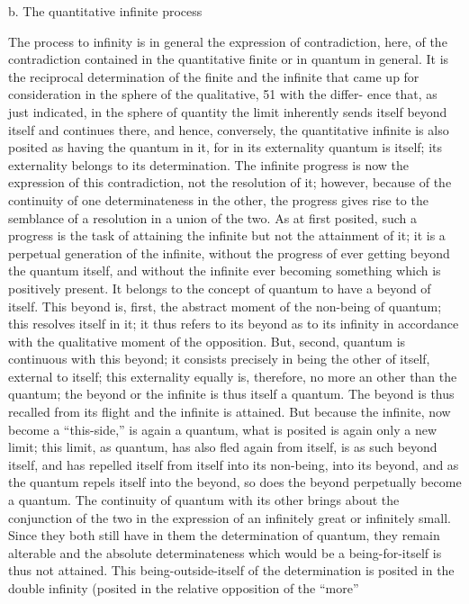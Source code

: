 b. The quantitative infinite process

The process to infinity is in general the expression of contradiction, here,
of the contradiction contained in the quantitative finite or in quantum in
general. It is the reciprocal determination of the finite and the infinite that
came up for consideration in the sphere of the qualitative, 51 with the differ-
ence that, as just indicated, in the sphere of quantity the limit inherently
sends itself beyond itself and continues there, and hence, conversely, the
quantitative infinite is also posited as having the quantum in it, for in its
externality quantum is itself; its externality belongs to its determination.
The infinite progress is now the expression of this contradiction, not the
resolution of it; however, because of the continuity of one determinateness
in the other, the progress gives rise to the semblance of a resolution in a
union of the two. As at first posited, such a progress is the task of attaining
the infinite but not the attainment of it; it is a perpetual generation of the
infinite, without the progress of ever getting beyond the quantum itself, and
without the infinite ever becoming something which is positively present.
It belongs to the concept of quantum to have a beyond of itself. This
beyond is, first, the abstract moment of the non-being of quantum; this
resolves itself in it; it thus refers to its beyond as to its infinity in accordance
with the qualitative moment of the opposition. But, second, quantum is
continuous with this beyond; it consists precisely in being the other of
itself, external to itself; this externality equally is, therefore, no more an
other than the quantum; the beyond or the infinite is thus itself a quantum.
The beyond is thus recalled from its flight and the infinite is attained. But
because the infinite, now become a “this-side,” is again a quantum, what
is posited is again only a new limit; this limit, as quantum, has also fled
again from itself, is as such beyond itself, and has repelled itself from itself
into its non-being, into its beyond, and as the quantum repels itself into
the beyond, so does the beyond perpetually become a quantum.
The continuity of quantum with its other brings about the conjunction
of the two in the expression of an infinitely great or infinitely small. Since
they both still have in them the determination of quantum, they remain
alterable and the absolute determinateness which would be a being-for-itself
is thus not attained. This being-outside-itself of the determination is posited
in the double infinity (posited in the relative opposition of the “more”
